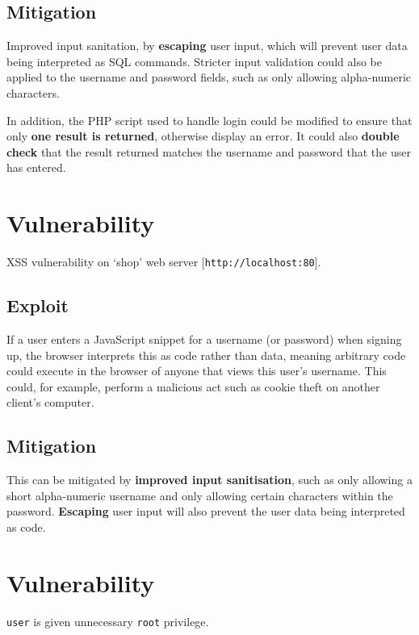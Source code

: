 \documentclass[11pt]{article}
\begin{document}
\subsection{Mitigation}

Improved input sanitation, by \textbf{escaping} user input, which will prevent user data being interpreted as SQL commands. Stricter input validation could also be applied to the username and password fields, such as only allowing alpha-numeric characters.

In addition, the PHP script used to handle login could be modified to ensure that only \textbf{one result is returned}, otherwise display an error. It could also \textbf{double check} that the result returned matches the username and password that the user has entered.

\section{Vulnerability}

XSS vulnerability on `shop' web server [\texttt{http://localhost:80}].

\subsection{Exploit}

If a user enters a JavaScript snippet for a username (or password) when signing up, the browser interprets this as code rather than data, meaning arbitrary code could execute in the browser of anyone that views this user's username. This could, for example, perform a malicious act such as cookie theft on another client's computer.

\subsection{Mitigation}

This can be mitigated by \textbf{improved input sanitisation}, such as only allowing a short alpha-numeric username and only allowing certain characters within the password. \textbf{Escaping} user input will also prevent the user data being interpreted as code.

\section{Vulnerability}

\texttt{user} is given unnecessary \texttt{root} privilege.
\end{document}
